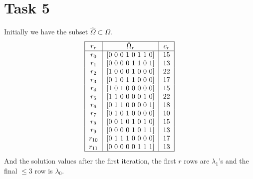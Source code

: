 \documentclass{article}
\begin{document}
    \section*{Task 5}
    Initially we have the subset $\hat{\Omega} \subset \Omega$.
    \[
        \begin{tabular}{ |c| c|c|c|c|c|c|c|c | }
            \hline
            $r_r$ &     $\hat{\Omega}_r$    &  $c_r$ \\
            \hline
            $r_0$ &     [0 0 0 1 0 1 1 0]   &  $15$ \\
            $r_1$ &     [0 0 0 0 1 1 0 1]   &  $13$ \\
            $r_2$ &     [1 0 0 0 1 0 0 0]   &  $22$ \\
            $r_3$ &     [0 1 0 1 1 0 0 0]   &  $17$ \\
            $r_4$ &     [1 0 1 0 0 0 0 0]   &  $15$ \\
            $r_5$ &     [1 1 0 0 0 0 1 0]   &  $22$ \\
            $r_6$ &     [0 1 1 0 0 0 0 1]   &  $18$ \\
            $r_7$ &     [0 1 0 1 0 0 0 0]   &  $10$ \\
            $r_8$ &     [0 0 1 0 1 0 1 0]   &  $15$ \\
            $r_9$ &     [0 0 0 0 1 0 1 1]   &  $13$ \\
            $r_{10}$ &  [0 1 1 1 0 0 0 0]   &  $17$ \\
            $r_{11}$ &  [0 0 0 0 0 1 1 1]   &  $13$ \\
            \hline
        \end{tabular}
    \]
    And the solution values after the first iteration, the first $r$ rows are $\lambda_1$'s and the final $\leq 3$ row is $\lambda_0$.
\end{document}
